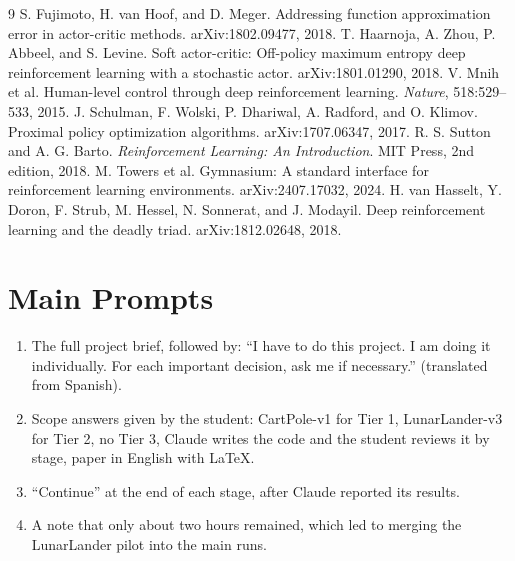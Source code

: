 \documentclass[10pt,twocolumn]{article}
\begin{document}
\begin{thebibliography}{9}\small
{} S. Fujimoto, H. van Hoof, and D. Meger. Addressing function approximation error in actor-critic methods. arXiv:1802.09477, 2018.
 T. Haarnoja, A. Zhou, P. Abbeel, and S. Levine. Soft actor-critic: Off-policy maximum entropy deep reinforcement learning with a stochastic actor. arXiv:1801.01290, 2018.
 V. Mnih et al. Human-level control through deep reinforcement learning. \emph{Nature}, 518:529--533, 2015.
 J. Schulman, F. Wolski, P. Dhariwal, A. Radford, and O. Klimov. Proximal policy optimization algorithms. arXiv:1707.06347, 2017.
 R. S. Sutton and A. G. Barto. \emph{Reinforcement Learning: An Introduction}. MIT Press, 2nd edition, 2018.
 M. Towers et al. Gymnasium: A standard interface for reinforcement learning environments. arXiv:2407.17032, 2024.
 H. van Hasselt, Y. Doron, F. Strub, M. Hessel, N. Sonnerat, and J. Modayil. Deep reinforcement learning and the deadly triad. arXiv:1812.02648, 2018.
\end{thebibliography}

\appendix
\section{Main Prompts}
\label{app:prompts}
\small
\begin{enumerate}
\item The full project brief, followed by: ``I have to do this project. I am doing it individually. For each important decision, ask me if necessary.'' (translated from Spanish).
\item Scope answers given by the student: CartPole-v1 for Tier 1, LunarLander-v3 for Tier 2, no Tier 3, Claude writes the code and the student reviews it by stage, paper in English with LaTeX.
\item ``Continue'' at the end of each stage, after Claude reported its results.
\item A note that only about two hours remained, which led to merging the LunarLander pilot into the main runs.
\end{enumerate}
\end{document}
